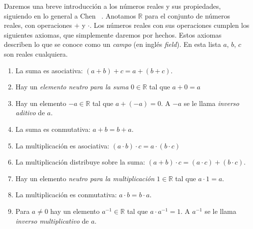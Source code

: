   Daremos una breve introducción a los números reales y sus propiedades,
  siguiendo en lo general a Chen~%
    \cite[capítulo 1]{chen08:_first_year_calculus}.
  Anotamos \(\mathbb{R}\) para el conjunto de números reales,%
  con operaciones \(+\) y \(\cdot\).
  Los números reales con sus operaciones cumplen los siguientes axiomas,%
  que simplemente daremos por hechos.
  Estos axiomas describen lo que se conoce como un \emph{campo}%
  (en inglés \emph{\foreignlanguage{english}{field}}).%
  En esta lista \(a\), \(b\), \(c\) son reales cualquiera.
  \begin{enumerate}[label=\textbf{R\arabic{*}:}, ref=R\arabic{*}]
  \item\label{Re:suma-asociativa}%
    La suma es asociativa:
    \((a + b) + c = a + (b + c)\).
  \item\label{Re:cero}%
    Hay un \emph{elemento neutro para la suma} \(0 \in \mathbb{R}\)
    tal que \(a + 0 = a\)
  \item\label{Re:inverso-aditivo}%
    Hay un elemento \(-a \in \mathbb{R}\)
    tal que \(a + (-a) = 0\).
    A \(-a\) se le llama \emph{inverso aditivo} de \(a\).
  \item\label{Re:suma-conmutativa}%
    La suma es conmutativa:
    \(a + b = b + a\).
  \item\label{Re:multiplicacion-asociativa}%
    La multiplicación es asociativa:
    \((a \cdot b) \cdot c = a \cdot (b \cdot c)\)
  \item\label{Re:distributiva}%
    La multiplicación distribuye sobre la suma:
    \((a + b) \cdot c = (a \cdot c) + (b \cdot c)\).
  \item\label{Re:uno}
    Hay un elemento \emph{neutro para la multiplicación} \(1 \in \mathbb{R}\)
    tal que \(a \cdot 1 = a\).
  \item\label{Re:multiplicacion-conmutativa}
    La multiplicación es conmutativa:
    \(a \cdot b = b \cdot a\).
  \item\label{Re:inverso-multiplicativo}
    Para \(a \ne 0\) hay un elemento \(a^{-1} \in \mathbb{R}\)
    tal que \(a \cdot a^{-1} = 1\).
    A \(a^{-1}\) se le llama \emph{inverso multiplicativo} de \(a\).
  \end{enumerate}

